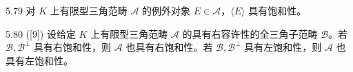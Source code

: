 
\begin{example}{5.79} 对 $K$ 上有限型三角范畴 $\mathcal{A}$ 的例外对象 $E \in \mathcal{A}$，$\langle E\rangle$ 具有饱和性。\end{example}


\begin{lemma}{5.80} ([9]) 设给定 $K$ 上有限型三角范畴 $\mathcal{A}$ 的具有右容许性的全三角子范畴 $\mathcal{B}$。若 $\mathcal{B}, \mathcal{B}^{\perp}$ 具有右饱和性，则 $\mathcal{A}$ 也具有右饱和性。若 $\mathcal{B}, \mathcal{B}^{\perp}$ 具有左饱和性，则 $\mathcal{A}$ 也具有左饱和性。\end{lemma}

